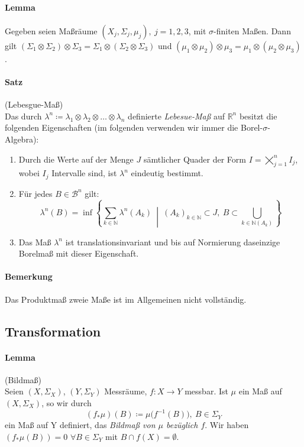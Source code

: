 \documentclass[12pt,a4paper,fleqn]{article}
\def\set#1{{\left\{ #1 \right\}}}
\def\Mid{\ \middle|\ }
\begin{document}
\paragraph{Lemma} Gegeben seien Maßräume $(X_j, \Sigma_j, \mu_j),\ j=1, 2, 3$, mit $\sigma$-finiten Maßen. Dann gilt $(\Sigma_1 \otimes \Sigma_2) \otimes \Sigma_3 = \Sigma_1 \otimes (\Sigma_2 \otimes \Sigma_3)$ und $(\mu_1 \otimes \mu_2) \otimes \mu_3 = \mu_1 \otimes (\mu_2 \otimes \mu_3)$.

\paragraph{Satz} (Lebesgue-Maß)\\
Das durch $\lambda^n \coloneqq \lambda_1 \otimes \lambda_2 \otimes \dots \otimes \lambda_n$ definierte \textit{Lebesue-Maß} auf $\mathbb{R}^n$ besitzt die folgenden Eigenschaften (im folgenden verwenden wir immer die Borel-$\sigma$-Algebra):
\begin{enumerate}
\item Durch die Werte auf der Menge $J$ sämtlicher Quader der Form $I = \bigtimes_{j=1}^n I_j$, wobei $I_j$ Intervalle sind, ist $\lambda^n$ eindeutig bestimmt.
\item Für jedes $B \in \mathcal{B}^n$ gilt:
\begin{displaymath}
\lambda^n(B) = \inf \set{\sum_{k \in \mathbb{N}} \lambda^n(A_k) \Mid (A_k)_{k \in \mathbb{N}} \subset J,\ B \subset \bigcup_{k \in \mathbb{N} (A_k)}}
\end{displaymath}
\item Das Maß $\lambda^n$ ist translationsinvariant und bis auf Normierung daseinzige Borelmaß mit dieser Eigenschaft.
\end{enumerate}

\paragraph{Bemerkung} Das Produktmaß zweie Maße ist im Allgemeinen nicht vollständig.

\subsection{Transformation}
\paragraph{Lemma} (Bildmaß)\\
Seien $(X, \Sigma_X)$, $(Y, \Sigma_Y)$ Messräume, $f\colon X \rightarrow Y$ messbar. Ist $\mu$ ein Maß auf $(X, \Sigma_X)$, so wir durch 
\begin{displaymath}
(f_\ast\mu)(B) \coloneqq \mu\big(f^{-1}(B)\big),\ B \in \Sigma_Y
\end{displaymath}
ein Maß auf Y definiert, das \textit{Bildmaß von $\mu$ bezüglich $f$}. Wir haben \mbox{$(f_\ast\mu(B))= 0$} $\forall B \in \Sigma_Y$ mit $B \cap f(X) = \emptyset$.
\end{document}
